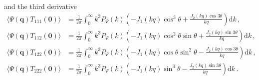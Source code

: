 \documentclass[a4paper, 11pt]{article}
\begin{document}
and the third derivative
\begin{align}
\langle \Psi(\bm{q}) T_{111}(\bm{0})\rangle &=\frac{1}{2\pi} \int_0^\infty k^3 P_{\Psi}(k) \left(-J_1(kq)\cos^3 \theta + \frac{J_2(kq) \cos 3\theta}{kq} \right)\mathrm{d}k\,,\\
\langle \Psi(\bm{q}) T_{112}(\bm{0})\rangle &=\frac{1}{2\pi} \int_0^\infty k^3 P_{\Psi}(k) \left(-J_1(kq)\cos^2\theta \sin \theta + \frac{J_2(kq)\sin 3\theta}{kq} \right)\mathrm{d}k\,,\\
\langle \Psi(\bm{q}) T_{122}(\bm{0})\rangle &=\frac{1}{2\pi} \int_0^\infty k^3 P_{\Psi}(k) \left(-J_1(kq)\cos \theta \sin^2\theta -\frac{J_2(kq)\cos3\theta}{kq}\right)\mathrm{d}k\,,\\
\langle \Psi(\bm{q}) T_{222}(\bm{0})\rangle &=\frac{1}{2\pi} \int_0^\infty k^3 P_{\Psi}(k) \left( -J_1(kq) \sin^3 \theta - \frac{J_2(kq)\sin3\theta}{kq}\right)\mathrm{d}k\,.
\end{align}
%
%

\end{document}
